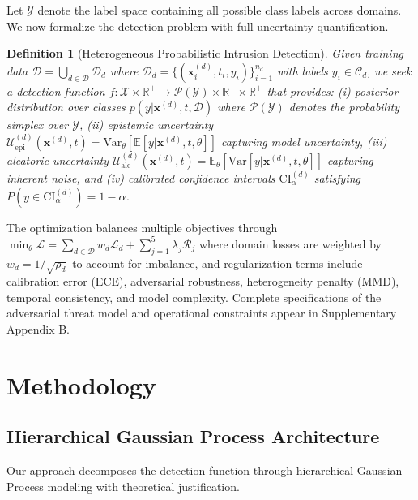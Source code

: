 \documentclass[review,12pt]{elsarticle}
\newcommand{\R}{\mathbb{R}}
\newcommand{\E}{\mathbb{E}}
\newtheorem{definition}{Definition}
\begin{document}
Let $\mathcal{Y}$ denote the label space containing all possible class labels across domains. We now formalize the detection problem with full uncertainty quantification.

\begin{definition}[Heterogeneous Probabilistic Intrusion Detection]
Given training data $\mathcal{D} = \bigcup_{d \in \mathcal{D}} \mathcal{D}_d$ where $\mathcal{D}_d = \{(\mathbf{x}_i^{(d)}, t_i, y_i)\}_{i=1}^{n_d}$ with labels $y_i \in \mathcal{C}_d$, we seek a detection function $f: \mathcal{X} \times \R^+ \rightarrow \mathcal{P}(\mathcal{Y}) \times \R^+ \times \R^+$ that provides: (i) posterior distribution over classes $p(y|\mathbf{x}^{(d)}, t, \mathcal{D})$ where $\mathcal{P}(\mathcal{Y})$ denotes the probability simplex over $\mathcal{Y}$, (ii) epistemic uncertainty $\mathcal{U}_{\text{epi}}^{(d)}(\mathbf{x}^{(d)}, t) = \text{Var}_{\theta}[\E[y|\mathbf{x}^{(d)}, t, \theta]]$ capturing model uncertainty, (iii) aleatoric uncertainty $\mathcal{U}_{\text{ale}}^{(d)}(\mathbf{x}^{(d)}, t) = \E_{\theta}[\text{Var}[y|\mathbf{x}^{(d)}, t, \theta]]$ capturing inherent noise, and (iv) calibrated confidence intervals $\text{CI}_{\alpha}^{(d)}$ satisfying $P(y \in \text{CI}_{\alpha}^{(d)}) = 1-\alpha$.
\end{definition}

The optimization balances multiple objectives through $\min_{\theta} \mathcal{L} = \sum_{d \in \mathcal{D}} w_d \mathcal{L}_d + \sum_{j=1}^5 \lambda_j \mathcal{R}_j$ where domain losses are weighted by $w_d = 1/\sqrt{\rho_d}$ to account for imbalance, and regularization terms include calibration error (ECE), adversarial robustness, heterogeneity penalty (MMD), temporal consistency, and model complexity. Complete specifications of the adversarial threat model and operational constraints appear in Supplementary Appendix B.

\section{Methodology}

\subsection{Hierarchical Gaussian Process Architecture}

Our approach decomposes the detection function through hierarchical Gaussian Process modeling with theoretical justification.
\end{document}
